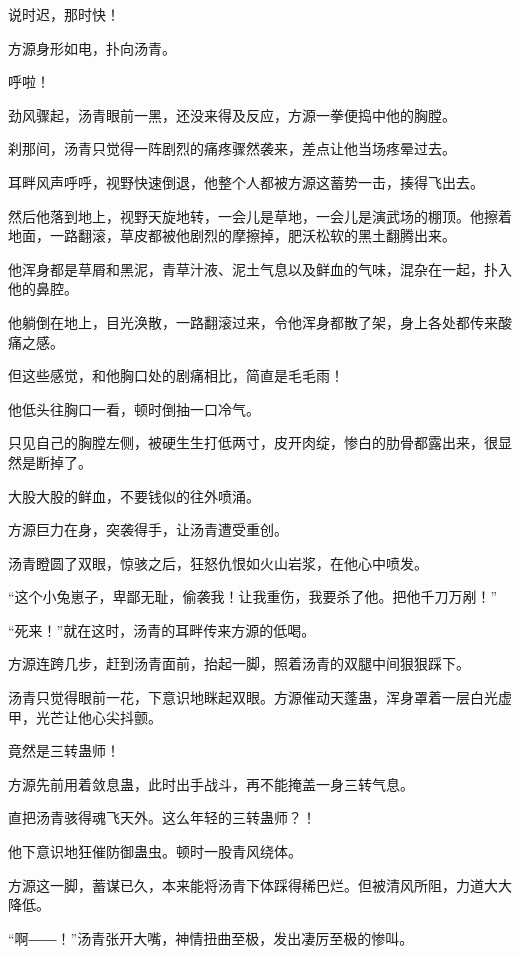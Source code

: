 
\begin{this_body}

说时迟，那时快！

方源身形如电，扑向汤青。

呼啦！

劲风骤起，汤青眼前一黑，还没来得及反应，方源一拳便捣中他的胸膛。

刹那间，汤青只觉得一阵剧烈的痛疼骤然袭来，差点让他当场疼晕过去。

耳畔风声呼呼，视野快速倒退，他整个人都被方源这蓄势一击，揍得飞出去。

然后他落到地上，视野天旋地转，一会儿是草地，一会儿是演武场的棚顶。他擦着地面，一路翻滚，草皮都被他剧烈的摩擦掉，肥沃松软的黑土翻腾出来。

他浑身都是草屑和黑泥，青草汁液、泥土气息以及鲜血的气味，混杂在一起，扑入他的鼻腔。

他躺倒在地上，目光涣散，一路翻滚过来，令他浑身都散了架，身上各处都传来酸痛之感。

但这些感觉，和他胸口处的剧痛相比，简直是毛毛雨！

他低头往胸口一看，顿时倒抽一口冷气。

只见自己的胸膛左侧，被硬生生打低两寸，皮开肉绽，惨白的肋骨都露出来，很显然是断掉了。

大股大股的鲜血，不要钱似的往外喷涌。

方源巨力在身，突袭得手，让汤青遭受重创。

汤青瞪圆了双眼，惊骇之后，狂怒仇恨如火山岩浆，在他心中喷发。

“这个小兔崽子，卑鄙无耻，偷袭我！让我重伤，我要杀了他。把他千刀万剐！”

“死来！”就在这时，汤青的耳畔传来方源的低喝。

方源连跨几步，赶到汤青面前，抬起一脚，照着汤青的双腿中间狠狠踩下。

汤青只觉得眼前一花，下意识地眯起双眼。方源催动天蓬蛊，浑身罩着一层白光虚甲，光芒让他心尖抖颤。

竟然是三转蛊师！

方源先前用着敛息蛊，此时出手战斗，再不能掩盖一身三转气息。

直把汤青骇得魂飞天外。这么年轻的三转蛊师？！

他下意识地狂催防御蛊虫。顿时一股青风绕体。

方源这一脚，蓄谋已久，本来能将汤青下体踩得稀巴烂。但被清风所阻，力道大大降低。

“啊――！”汤青张开大嘴，神情扭曲至极，发出凄厉至极的惨叫。


\end{this_body}
